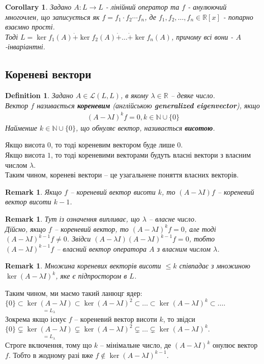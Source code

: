\documentclass[a4paper, 10pt]{article}
\theoremstyle{theoremdd}
\newtheorem{definition}[theorem]{Definition}
\newtheorem{remark}[theorem]{Remark}
\newtheorem{corollary}[theorem]{Corollary}
\begin{document}
\begin{corollary}
Задано $A: L \to L$ - лінійний оператор та $f$ - анулюючий многочлен, що записується як $f = f_1 \cdot f_2 \cdots f_n$, де $f_1,f_2,\dots,f_n \in \mathbb{R}[x]$ - попарно взаємно прості.\\
Тоді $L = \ker f_1(A) \dot{+} \ker f_2(A) \dot{+} \dots \dot{+} \ker f_n(A)$, причому всі вони - $A$-інваріантні.
\end{corollary}
\fi

\subsection{Кореневі вектори}
\begin{definition}
Задано $A \in \mathcal{L}(L,L)$, в якому $\lambda \in \mathbb{R}$ -- деяке число.\\
Вектор $f$ називається \textbf{кореневим} (англійською \textbf{generalized eigenvector}), якщо
\begin{align*}
(A-\lambda I)^k f = 0, k \in \mathbb{N} \cup \{0\}
\end{align*}
Найменше $k \in \mathbb{N} \cup \{0\}$, що обнуляє вектор, називається \textbf{висотою}.
\end{definition}
\noindent
Якщо висота $0$, то тоді кореневим вектором буде лише $0$.\\
Якщо висота $1$, то тоді кореневими векторами будуть власні вектори з власним числом $\lambda$.\\
Таким чином, кореневі вектори -- це узагальнене поняття власних векторів.

\begin{remark}
Якщо $f$ -- кореневий вектор висоти $k$, то $(A-\lambda I)f$ -- кореневий вектор висоти $k-1$.
\end{remark}

\begin{remark}
Тут із означення випливає, що $\lambda$ -- власне число. \\
Дійсно, якщо $f$ -- кореневий вектор, то $(A-\lambda I)^k f = 0$, але тоді $(A-\lambda I)^{k-1} f \neq 0$. Звідси $(A-\lambda I) (A-\lambda I)^{k-1} f = 0$, тобто $(A-\lambda I)^{k-1} f$ -- власний вектор оператора $A$ з власним числом $\lambda$.
\end{remark}

\begin{remark}
Множина кореневих векторів висоти $\leq k$ співпадає з множиною $\ker(A-\lambda I)^k$, яке є підпростором в $L$.
\end{remark}
\noindent
Таким чином, ми маємо такий ланюцг ядер:\\
$\{0\} \subset \underset{= L_\lambda}{\ker(A-\lambda I)} \subset \ker(A-\lambda I)^2 \subset \dots \subset \ker(A-\lambda I)^k \subset \dots$.\\
Зокрема якщо існує $f$ -- кореневий вектор висоти $k$, то звідси\\
$\{0\} \subsetneq \underset{= L_\lambda}{\ker(A-\lambda I)} \subsetneq \ker(A-\lambda I)^2 \subsetneq \dots \subsetneq \ker(A-\lambda I)^k$.\\
Строге включення, тому що $k$ -- мінімальне число, де $(A-\lambda I)^k$ онулює вектор $f$. Тобто в жодному разі вже $f \notin \ker(A-\lambda I)^{k-1}$.
\end{document}
